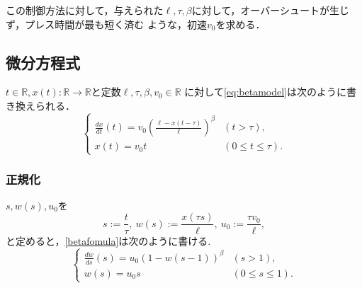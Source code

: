 \documentclass [dvipdfmx] {jsarticle}
\numberwithin{equation}{section}
\theoremstyle{definition} %
\theoremstyle{definition} %
\begin{document}
この制御方法に対して，与えられた$\ell,\tau,\beta$に対して，オーバーシュートが生じず，プレス時間が最も短く済む
ような，初速$v_0$を求める．









\subsection{微分方程式}
$t\in\mathbb{R},x(t)\colon\mathbb{R}\rightarrow\mathbb{R}$と定数$\ell,\tau,\beta,v_0\in\mathbb{R}$
に対して\eqref{eq:betamodel}は次のように書き換えられる．
\begin{equation}\label{betafomula}\begin{cases}
    \displaystyle\frac{dx}{dt}(t)=v_0\left(\frac{\ell-x(t-\tau)}{\ell}\right)^\beta &(t>\tau),\\
    x(t)=v_0 t &(0\le t \le \tau).
\end{cases}\end{equation}


\subsubsection{正規化}
$s,w(s),u_0$を
\begin{equation}
    s:=\frac{t}{\tau},\ w(s):=\frac{x(\tau s)}{\ell},\ u_0:=\frac{\tau v_0}{\ell},
\end{equation}
と定めると，\eqref{betafomula}は次のように書ける.
\begin{equation}\label{betafomula2}\begin{cases}
    \displaystyle\frac{dw}{ds}(s)=u_0(1-w(s-1))^\beta &(s>1),\\
    w(s)=u_0 s &(0\le s \le 1).
\end{cases}\end{equation}
\end{document}
